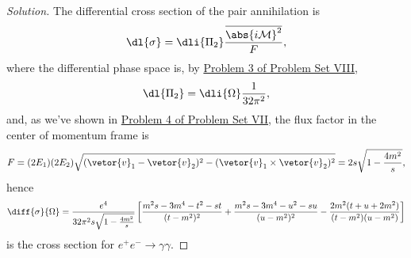 \begin{proof}[Solution]
    The differential cross section of the pair annihilation is
    \begin{equation*}
        \dl{\sigma} = \dli{\Pi_2} \frac{\overline{\abs{i\mathcal{M}}^2}}{F},
    \end{equation*}
    where the differential phase space is, by \href{https://github.com/louisradial/4305107-quantum-field-theory-i/releases/tag/pset8}{Problem 3 of Problem Set VIII},
    \begin{equation*}
        \dl{\Pi_2} = \dli{\Omega} \frac{1}{32\pi^2},
    \end{equation*}
    and, as we've shown in \href{https://github.com/louisradial/4305107-quantum-field-theory-i/releases/tag/pset7}{Problem 4 of Problem Set VII}, the flux factor in the center of momentum frame is
    \begin{equation*}
    F = (2E_1)(2E_2) \sqrt{(\vetor{v}_1 - \vetor{v}_2)^2 - (\vetor{v}_1 \times \vetor{v}_2)^2} = 2 s\sqrt{1 - \frac{4m^2}{s}},
    \end{equation*}
    hence
    \begin{equation*}
        \diff{\sigma}{\Omega} = \frac{e^4}{32\pi^2 s\sqrt{1 - \frac{4m^2}{s}}}\left[\frac{m^2s-3m^4 - t^2 - st}{(t - m^2)^2} + \frac{m^2s-3m^4 - u^2 - su}{(u - m^2)^2}- \frac{2m^2 (t + u + 2m^2)}{(t - m^2)(u - m^2)}\right]
    \end{equation*}
    is the cross section for \(e^+ e^- \to \gamma \gamma.\)
\end{proof}
